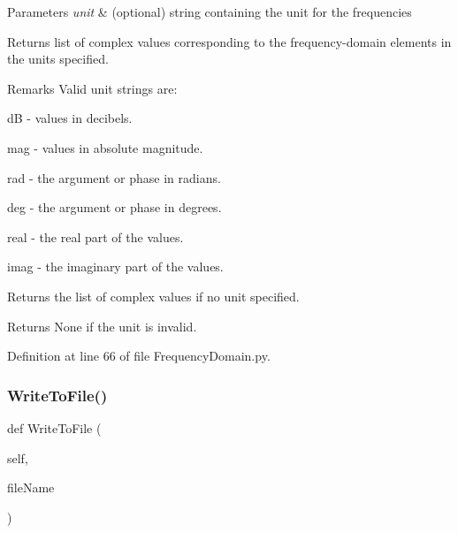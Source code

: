 \begin{DoxyParams}{Parameters}
{\em unit} & (optional) string containing the unit for the frequencies \\
\hline
\end{DoxyParams}
\begin{DoxyReturn}{Returns}
list of complex values corresponding to the frequency-\/domain elements in the units specified. 
\end{DoxyReturn}
\begin{DoxyRemark}{Remarks}
Valid unit strings are\+:
\begin{DoxyItemize}
\item \textquotesingle{}dB\textquotesingle{} -\/ values in decibels.
\item \textquotesingle{}mag\textquotesingle{} -\/ values in absolute magnitude.
\item \textquotesingle{}rad\textquotesingle{} -\/ the argument or phase in radians.
\item \textquotesingle{}deg\textquotesingle{} -\/ the argument or phase in degrees.
\item \textquotesingle{}real\textquotesingle{} -\/ the real part of the values.
\item \textquotesingle{}imag\textquotesingle{} -\/ the imaginary part of the values.
\end{DoxyItemize}
\end{DoxyRemark}
Returns the list of complex values if no unit specified.

Returns None if the unit is invalid. 

Definition at line 66 of file Frequency\+Domain.\+py.

\mbox{\label{classSignalIntegrity_1_1FrequencyDomain_1_1FrequencyDomain_1_1FrequencyDomain_a9bc60dff701312ba7ddf47ee941bbc8f}} 
\subsubsection{\texorpdfstring{Write\+To\+File()}{WriteToFile()}}
{\footnotesize\ttfamily def Write\+To\+File (\begin{DoxyParamCaption}\item[{}]{self,  }\item[{}]{file\+Name }\end{DoxyParamCaption})}



